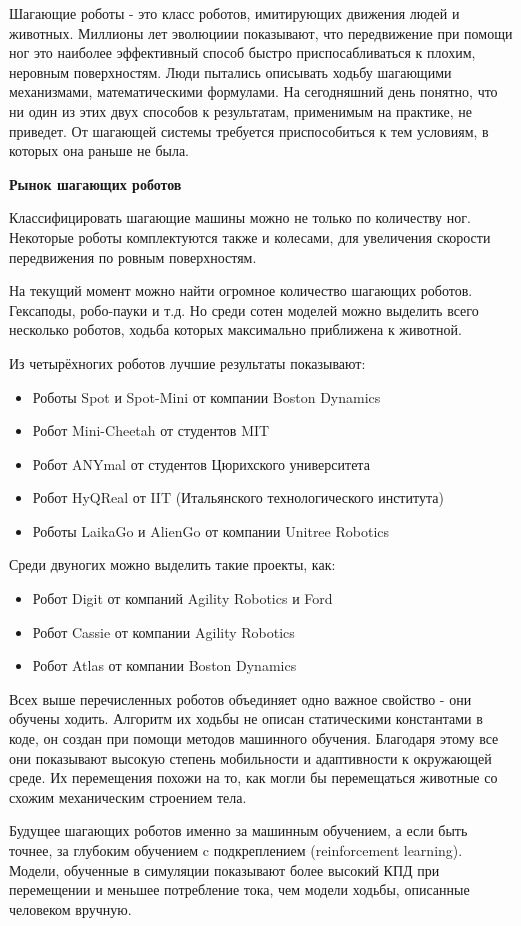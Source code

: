 
Шагающие роботы - это класс роботов, имитирующих движения людей и животных. Миллионы лет эволюциии показывают, что передвижение при помощи ног это наиболее эффективный способ быстро приспосабливаться к плохим, неровным поверхностям. Люди пытались описывать ходьбу шагающими механизмами, математическими формулами. На сегодняшний день понятно, что ни один из этих двух способов к результатам, применимым на практике, не приведет. От шагающей системы требуется приспособиться к тем условиям, в которых она раньше не была.

\textbf{Рынок шагающих роботов}

Классифицировать шагающие машины можно не только по количеству ног. Некоторые роботы комплектуются также и колесами, для увеличения скорости передвижения по ровным поверхностям. 

На текущий момент можно найти огромное количество шагающих роботов. Гексаподы, робо-пауки и т.д. Но среди сотен моделей можно выделить всего несколько роботов, ходьба которых максимально приближена к животной.

Из четырёхногих роботов лучшие результаты показывают:
\begin{itemize}
    \item Роботы Spot и Spot-Mini от компании Boston Dynamics
    \item Робот Mini-Cheetah от студентов MIT
    \item Робот ANYmal от студентов Цюрихского университета
    \item Робот HyQReal от IIT (Итальянского технологического института)
    \item Роботы LaikaGo и AlienGo от компании Unitree Robotics
\end{itemize}

Среди двуногих можно выделить такие проекты, как:

\begin{itemize}
    \item Робот Digit от компаний Agility Robotics и Ford
    \item Робот Cassie от компании Agility Robotics
    \item Робот Atlas от компании Boston Dynamics
\end{itemize}

Всех выше перечисленных роботов объединяет одно важное свойство - они обучены ходить. Алгоритм их ходьбы не описан статическими константами в коде, он создан при помощи методов машинного обучения. Благодаря этому все они показывают высокую степень мобильности и адаптивности к окружающей среде. Их перемещения похожи на то, как могли бы перемещаться животные со схожим механическим строением тела.

Будущее шагающих роботов именно за машинным обучением, а если быть точнее, за глубоким обучением c подкреплением (reinforcement learning). Модели, обученные в симуляции показывают более высокий КПД при перемещении \cite{Hwangbo2019} и меньшее потребление тока, чем модели ходьбы, описанные человеком вручную. 
